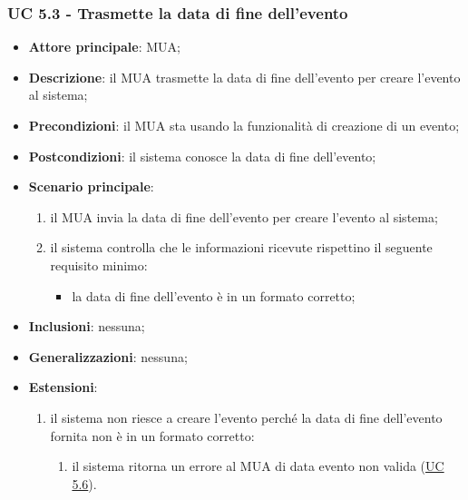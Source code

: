     \subsubsection{UC 5.3 - Trasmette la data di fine dell'evento} \label{sec:UC5.3}
    \begin{itemize}
        \item \textbf{Attore principale}: MUA;
        \item \textbf{Descrizione}: il MUA trasmette la data di fine dell'evento per creare l'evento al sistema;
        \item \textbf{Precondizioni}: il MUA sta usando la funzionalità di creazione di un evento;
        \item \textbf{Postcondizioni}: il sistema conosce la data di fine dell'evento;
        \item \textbf{Scenario principale}:
            \begin{enumerate}
                \item il MUA invia la data di fine dell'evento per creare l'evento al sistema;
                \item il sistema controlla che le informazioni ricevute rispettino il seguente requisito minimo:
                    \begin{itemize}
                        \item la data di fine dell'evento è in un formato corretto;
                    \end{itemize}
            \end{enumerate}
        \item \textbf{Inclusioni}: nessuna;
        \item \textbf{Generalizzazioni}: nessuna;
        \item \textbf{Estensioni}:
            \begin{enumerate}[label=\alph*.]
                \item il sistema non riesce a creare l'evento perché la data di fine dell'evento fornita non è in un formato corretto:
                \begin{enumerate}[label=\arabic*.]
                    \item il sistema ritorna un errore al MUA di data evento non valida (\hyperref[sec:UC5.6]{UC 5.6}).
                \end{enumerate}
            \end{enumerate}
    \end{itemize}

